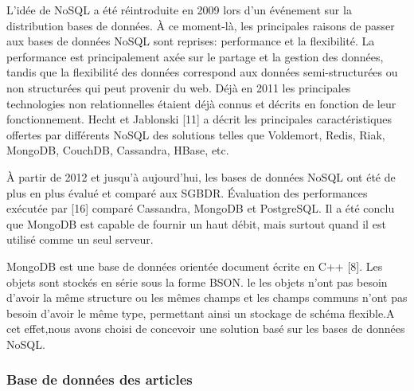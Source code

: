 L'idée de NoSQL a été réintroduite en 2009 lors d'un événement sur la distribution bases de données. À ce moment-là, les principales raisons de passer aux bases de données NoSQL sont reprises: performance et la flexibilité. La performance est principalement axée sur le partage et la gestion des données, tandis que la flexibilité des données correspond aux données semi-structurées ou non structurées qui peut provenir du web. Déjà en 2011 les principales technologies non relationnelles étaient déjà connus et décrits en fonction de leur fonctionnement. Hecht et
Jablonski [11] a décrit les principales caractéristiques offertes par différents NoSQL des solutions telles que Voldemort, Redis, Riak, MongoDB, CouchDB, Cassandra, HBase, etc.

À partir de 2012 et jusqu'à aujourd'hui, les bases de données NoSQL ont été de plus en plus évalué et comparé aux SGBDR. Évaluation des performances exécutée par [16] comparé Cassandra, MongoDB et PostgreSQL. Il a été conclu que MongoDB est capable de fournir un haut débit, mais surtout quand il est utilisé comme un seul serveur.

MongoDB est une base de données orientée document écrite en C++ \cite{}[8]. Les objets sont stockés en série sous la forme BSON. le
les objets n'ont pas besoin d'avoir la même structure ou les mêmes champs et les champs communs n'ont pas besoin d'avoir le même type,
permettant ainsi un stockage de schéma flexible.A cet effet,nous avons choisi de concevoir une solution basé sur les bases de données NoSQL.

\subsubsection{Base de données des articles}

